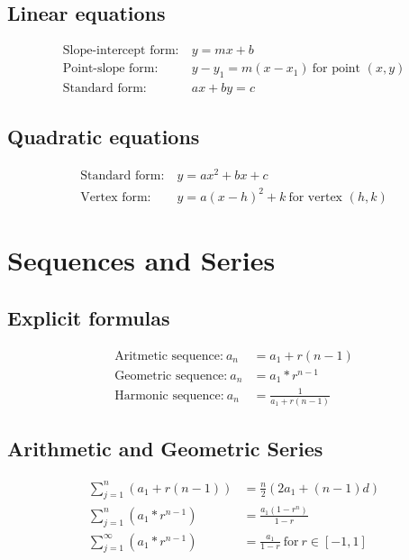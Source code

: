 \subsection{Linear equations}

\[\begin{aligned}
	\text{Slope-intercept form:}&~y = mx + b \\
	\text{Point-slope form:}&~y - y_1 = m(x - x_1)~\text{for point $(x, y)$} \\
	\text{Standard form:}&~ax + by = c
\end{aligned}\]


\subsection{Quadratic equations}

\[\begin{aligned}
	\text{Standard form:}&~y = ax^2 + bx + c \\
	\text{Vertex form:}&~y = a(x-h)^2 + k~\text{for vertex $(h, k)$}
\end{aligned}\]

\section{Sequences and Series}

\subsection{Explicit formulas}
\[\begin{aligned}
	\text{Aritmetic sequence:}~a_n &= a_1 + r(n - 1) \\
	\text{Geometric sequence:}~a_n &= a_1 * r^{n - 1} \\
	\text{Harmonic sequence:}~a_n &= \frac{1}{a_1 + r(n - 1)}
\end{aligned}\]

\subsection{Arithmetic and Geometric Series}

\[\begin{aligned}
	\sum_{j=1}^{n} (a_1 + r(n-1)) &= \frac{n}{2}(2a_1 + (n - 1) d) \\
	\sum_{j=1}^{n} (a_1 * r^{n - 1}) &= \frac{a_1 (1-r^n)}{1-r} \\
	\sum_{j=1}^{\infty} (a_1 * r^{n - 1}) &= \frac{a_1}{1-r} ~\text{for}~ r \in [-1, 1] \\
\end{aligned}\]

